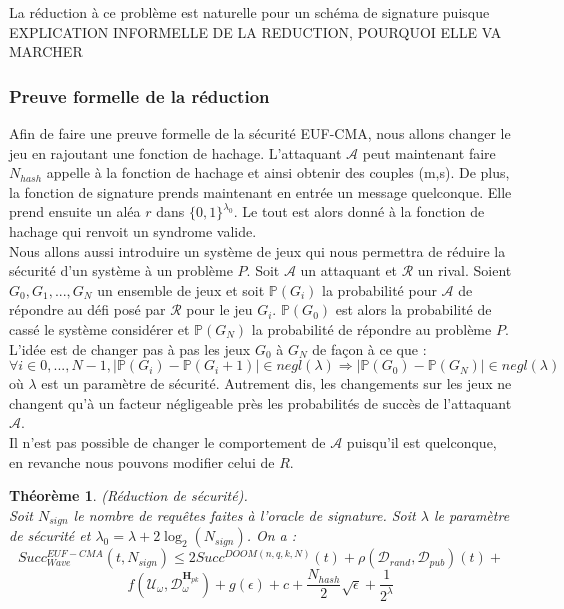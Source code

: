 \documentclass[12pt]{article}
\theoremstyle{plain}
\newtheorem{thm}{Théorème}[section]
\begin{document}
\noindent La réduction à ce problème est naturelle pour un schéma de signature puisque EXPLICATION INFORMELLE DE LA REDUCTION, POURQUOI ELLE VA MARCHER \\


\subsubsection{Preuve formelle de la réduction}
Afin de faire une preuve formelle de la sécurité EUF-CMA, nous allons changer le jeu en rajoutant une fonction de hachage. L'attaquant $\mathcal{A}$ peut maintenant faire $N_{hash}$ appelle à la fonction de hachage et ainsi obtenir des couples (m,s). De plus, la fonction de signature prends maintenant en entrée un message quelconque. Elle prend ensuite un aléa $r$ dans $\{0,1\}^{\lambda_0}$. Le tout est alors donné à la fonction de hachage qui renvoit un syndrome valide. \\

Nous allons aussi introduire un système de jeux qui nous permettra de réduire la sécurité d'un système à un problème $P$. Soit $\mathcal{A}$ un attaquant et $\mathcal{R}$ un rival. Soient $G_0, G_1, ...,G_N$ un ensemble de jeux et soit $\mathbb{P}(G_i)$ la probabilité pour $\mathcal{A}$ de répondre au défi posé par $\mathcal{R}$ pour le jeu $G_i$. $\mathbb{P}(G_0)$ est alors la probabilité de cassé le système considérer et $\mathbb{P}(G_N)$ la probabilité de répondre au problème $P$. \\
L'idée est de changer pas à pas les jeux $G_0$ à $G_N$ de façon à ce que :
$$\forall i \in {0,...,N-1}, |\mathbb{P}(G_i)-\mathbb{P}(G_i+1)| \in negl(\lambda) \Longrightarrow |\mathbb{P}(G_0)-\mathbb{P}(G_N)|  \in negl(\lambda)$$
où $\lambda$ est un paramètre de sécurité. Autrement dis, les changements sur les jeux ne changent qu'à un facteur négligeable près les probabilités de succès de l'attaquant $\mathcal{A}$. \\
Il n'est pas possible de changer le comportement de $\mathcal{A}$ puisqu'il est quelconque, en revanche nous pouvons modifier celui de $R$. \\

\begin{thm} (Réduction de sécurité). \\
Soit $N_{sign}$ le nombre de requêtes faites à l'oracle de signature. Soit $\lambda$ le paramètre de sécurité et $\lambda_0=\lambda + 2\log_2(N_{sign})$. On a :
$$Succ^{EUF-CMA}_{Wave}(t,N_{sign}) \leq 2Succ^{DOOM(n,q,k,N)}(t) +\rho(\mathcal{D}_{rand},\mathcal{D}_{pub})(t) + $$
$$ f(\mathcal{U}_{\omega},\mathcal{D}_{\omega}^{\mathbf{H}_{pk}}) + g(\epsilon) + c + \frac{N_{hash}}{2}\sqrt{\epsilon} + \frac{1}{2^{\lambda}}$$
\end{thm}
\end{document}
